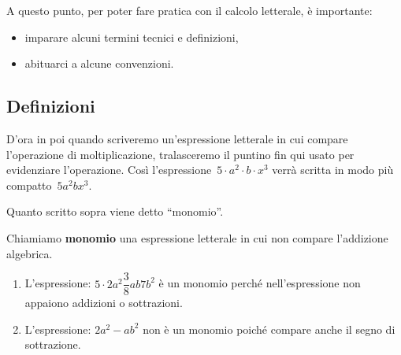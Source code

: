 A questo punto, per poter fare pratica con il calcolo letterale, 
è importante:
\begin{itemize} [nosep]
\item imparare alcuni termini tecnici e definizioni,
\item abituarci a alcune convenzioni.
\end{itemize}


\subsection{Definizioni}
\label{subsec:monomi_definizioni}

D'ora in poi quando scriveremo un'espressione letterale in cui compare
l'operazione di moltiplicazione, tralasceremo il puntino fin qui usato 
per evidenziare l'operazione.
Così l'espressione~\(5 \cdot a^2 \cdot b \cdot x^3\) 
verrà scritta in modo
più compatto~\(5a^2bx^3\).

% 
Quanto scritto sopra viene detto ``monomio''.

\begin{definizione}{}{}
Chiamiamo \textbf{monomio} una espressione letterale in cui non compare
l'addizione algebrica.
\end{definizione}

\begin{esempio}{}{}
\begin{enumerate} [nosep]
\item 
L'espressione: \(5 \cdot 2a^{2} \dfrac{3}{8}ab7b^{2}\)
è un monomio perché nell'espressione non appaiono addizioni o sottrazioni.
\item 
L'espressione: \(2a^{2}-ab^{2}\) non è un monomio poiché compare anche il 
segno di sottrazione.
\end{enumerate}
\end{esempio}


